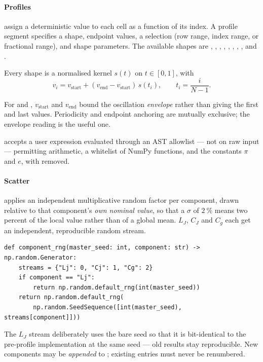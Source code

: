 \paragraph{Profiles} assign a deterministic value to each cell as a function of
its index. A profile segment specifies a shape, endpoint values, a selection
(row range, index range, or fractional range), and shape parameters. The
available shapes are
, , , , ,
, , , and .

Every shape is a normalised kernel $s(t)$ on $t\in[0,1]$, with
\begin{equation}
  v_i = v_{\mathrm{start}} + (v_{\mathrm{end}} - v_{\mathrm{start}})\,s(t_i),
  \qquad t_i = \frac{i}{N-1}.
\end{equation}

\begin{remark}
For  and , $v_{\mathrm{start}}$ and $v_{\mathrm{end}}$
bound the oscillation \emph{envelope} rather than giving the first and last
values. Periodicity and endpoint anchoring are mutually exclusive; the envelope
reading is the useful one.
\end{remark}

 accepts a user expression evaluated through an AST allowlist ---
not  on raw input --- permitting arithmetic, a whitelist of NumPy
functions, and the constants $\pi$ and $e$, with 
removed.

\paragraph{Scatter} applies an independent multiplicative random factor per
component, drawn relative to that component's \emph{own nominal value}, so that
a $\sigma$ of $\SI{2}{\percent}$ means two percent of the local value rather
than of a global mean. $L_J$, $C_J$ and $C_g$ each get an independent,
reproducible random stream.

\begin{implnote}
\begin{lstlisting}
def component_rng(master_seed: int, component: str) -> np.random.Generator:
    streams = {"Lj": 0, "Cj": 1, "Cg": 2}
    if component == "Lj":
        return np.random.default_rng(int(master_seed))
    return np.random.default_rng(
        np.random.SeedSequence([int(master_seed), streams[component]]))
\end{lstlisting}
The $L_J$ stream deliberately uses the bare seed so that it is bit-identical to
the pre-profile implementation at the same seed --- old results stay
reproducible. New components may be \emph{appended} to ; existing
entries must never be renumbered.
\end{implnote}

